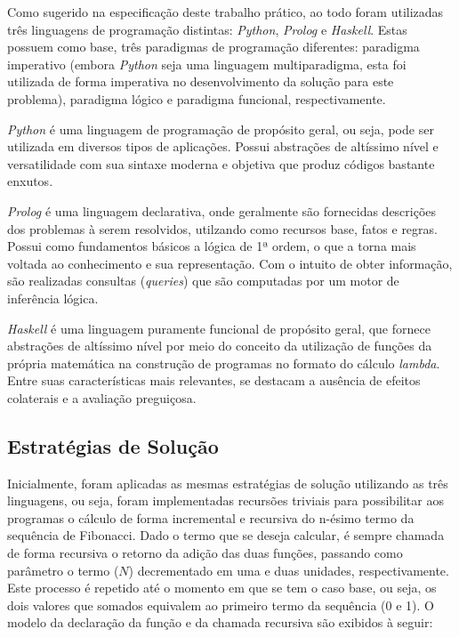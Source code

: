 \documentclass[a4paper, 12pt]{article}
\begin{document}
Como sugerido na especificação deste trabalho prático, ao todo foram utilizadas três linguagens de programação distintas: \emph{Python}, \emph{Prolog} e \emph{Haskell}. Estas possuem como base, três paradigmas de programação diferentes: paradigma imperativo (embora \emph{Python} seja uma linguagem multiparadigma, esta foi utilizada de forma imperativa no desenvolvimento da solução para este problema), paradigma lógico e paradigma funcional, respectivamente.

\emph{Python} é uma linguagem de programação de propósito geral, ou seja, pode ser utilizada em diversos tipos de aplicações. Possui abstrações de altíssimo nível e versatilidade com sua sintaxe moderna e objetiva que produz códigos bastante enxutos.

\emph{Prolog} é uma linguagem declarativa, onde geralmente são fornecidas descrições dos problemas à serem resolvidos, utilzando como recursos base, fatos e regras. Possui como fundamentos básicos a lógica de 1ª ordem, o que a torna mais voltada ao conhecimento e sua representação. Com o intuito de obter informação, são realizadas consultas (\emph{queries}) que são computadas por um motor de inferência lógica.

\emph{Haskell} é uma linguagem puramente funcional de propósito geral, que fornece abstrações de altíssimo nível por meio do conceito da utilização de funções da própria matemática na construção de programas no formato do cálculo \emph{lambda}. Entre suas características mais relevantes, se destacam a ausência de efeitos colaterais e a avaliação preguiçosa.

\subsection{Estratégias de Solução}

Inicialmente, foram aplicadas as mesmas estratégias de solução utilizando as três linguagens, ou seja, foram implementadas recursões triviais para possibilitar aos programas o cálculo de forma incremental e recursiva do n-ésimo termo da sequência de Fibonacci. Dado o termo que se deseja calcular, é sempre chamada de forma recursiva o retorno da adição das duas funções, passando como parâmetro o termo (\(N\)) decrementado em uma e duas unidades, respectivamente. Este processo é repetido até o momento em que se tem o caso base, ou seja, os dois valores que somados equivalem ao primeiro termo da sequência (0 e 1). O modelo da declaração da função e da chamada recursiva são exibidos à seguir:
\end{document}
